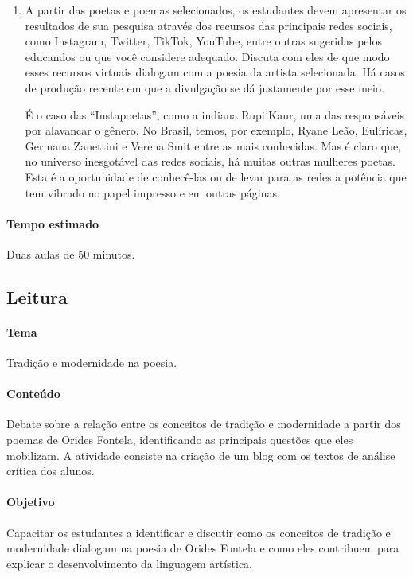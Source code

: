 \documentclass[12pt]{extarticle}
\begin{document}
\begin{enumerate}
\item A partir das poetas e poemas selecionados, os estudantes devem
apresentar os resultados de sua pesquisa através dos recursos das
principais redes sociais, como Instagram, Twitter, TikTok, YouTube,
entre outras sugeridas pelos educandos ou que você considere adequado.
Discuta com eles de que modo esses recursos virtuais dialogam com a
poesia da artista selecionada. Há casos de produção recente em que a
divulgação se dá justamente por esse meio. 


É o caso das ``Instapoetas'', como a indiana Rupi Kaur, uma das responsáveis por alavancar o gênero.
No Brasil, temos, por exemplo, Ryane Leão, Eulíricas, Germana Zanettini
e Verena Smit entre as mais conhecidas. Mas é claro que, no universo
inesgotável das redes sociais, há muitas outras mulheres poetas. Esta é
a oportunidade de conhecê-las ou de levar para as redes a potência que
tem vibrado no papel impresso e em outras páginas.
\end{enumerate}

\paragraph{Tempo estimado} Duas aulas de 50 minutos.

\subsection{Leitura}

\paragraph{Tema} Tradição e modernidade na poesia.

\paragraph{Conteúdo} Debate sobre a relação entre os conceitos de tradição
e modernidade a partir dos poemas de Orides Fontela, identificando as
principais questões que eles mobilizam. A atividade consiste na criação
de um blog com os textos de análise crítica dos alunos.

\paragraph{Objetivo} Capacitar os estudantes a identificar e discutir como
os conceitos de tradição e modernidade dialogam na poesia de Orides
Fontela e como eles contribuem para explicar o desenvolvimento da
linguagem artística.
\end{document}
